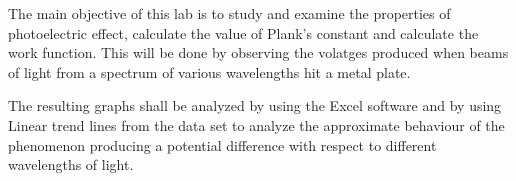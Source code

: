 {The main objective of this lab is to study and examine the properties of photoelectric effect, calculate the value of Plank's constant and calculate the work function. This will be done by observing the volatges produced when beams of light from a spectrum of various wavelengths hit a metal plate.}

{The resulting graphs shall be analyzed by using the Excel software and by using Linear trend lines from the data set to analyze the approximate behaviour of the phenomenon producing a potential difference with respect to different wavelengths of light.}

{}

